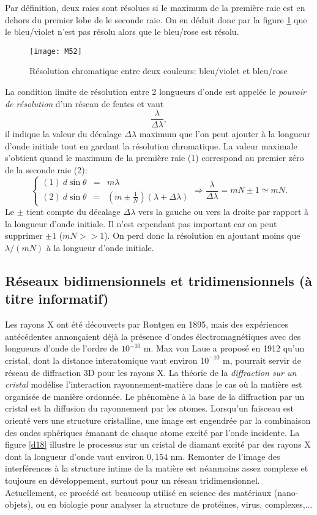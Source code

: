 \noindent Par définition, deux raies sont résolues si le maximum de la première raie est en dehors du premier lobe de le seconde raie. On en déduit donc par la figure \ref{d17} que le bleu/violet n'est pas résolu alors que le bleu/rose est résolu.


\begin{figure}[h!]
    \centering
    \texttt{[image: M52]}
    \caption{Résolution chromatique entre deux couleurs: bleu/violet et bleu/rose}
    \label{d17}
\end{figure}

\noindent La condition limite de résolution entre 2 longueurs d'onde est appelée le \textit{pouvoir de résolution} d'un réseau de fentes et vaut
$$
    \frac{\lambda}{\Delta\lambda},
$$
 il indique la valeur du décalage $\Delta\lambda$ maximum que l'on peut ajouter à la longueur d'onde initiale tout en gardant la résolution chromatique. La valeur maximale s'obtient quand le maximum de la première raie (1) correspond au premier zéro de la seconde raie (2):
\[
\left\{
\begin{array}{ccc}
 (1)\:d\sin \theta&=&m\lambda\\
 (2)\:d\sin \theta&=&(m\pm\frac{1}{N})(\lambda+\Delta\lambda)
\end{array}
\right.
\Longrightarrow
\frac{\lambda}{\Delta\lambda}=mN\pm1\simeq mN.
\]
Le $\pm$ tient compte du décalage $\Delta\lambda$ vers la gauche ou vers la droite par rapport à la longueur d'onde initiale. Il n'est cependant pas important car on peut supprimer $\pm1$ ($mN>>1$).
On perd donc la résolution en ajoutant moins que $\lambda/(mN)$ à la longueur d'onde initiale.


\subsection{Réseaux bidimensionnels et tridimensionnels (à titre informatif)}

Les rayons X ont été découverts par Rontgen en 1895, mais des expériences antécédentes annonçaient déjà la présence d'ondes électromagnétiques avec des longueurs d'onde de l'ordre de $10^{-10}$ m. Max von Laue a proposé en 1912 qu'un cristal, dont la distance interatomique vaut environ $10^{-10}$ m, pourrait servir de réseau de diffraction 3D pour les rayons X.
La théorie de la \textit{diffraction sur un cristal} modélise l'interaction rayonnement-matière dans le cas où la matière est organisée de manière ordonnée. Le phénomène à la base de la diffraction par un cristal est la diffusion du rayonnement par les atomes. 
Lorsqu'un faisceau est orienté vers une structure cristalline, une image est engendrée par la combinaison des ondes sphériques émanant de chaque atome excité par l'onde incidente. La figure \ref{d18} illustre le processus sur un cristal de diamant excité par des rayons X dont la longueur d'onde vaut environ $0,154$ nm. Remonter de l'image des interférences à la structure intime de la matière est néanmoins assez complexe et toujours en développement, surtout pour un réseau tridimensionnel.
Actuellement, ce procédé est beaucoup utilisé en science des matériaux (nano-objets), ou en biologie pour analyser la structure de protéines, virus, complexes,...

